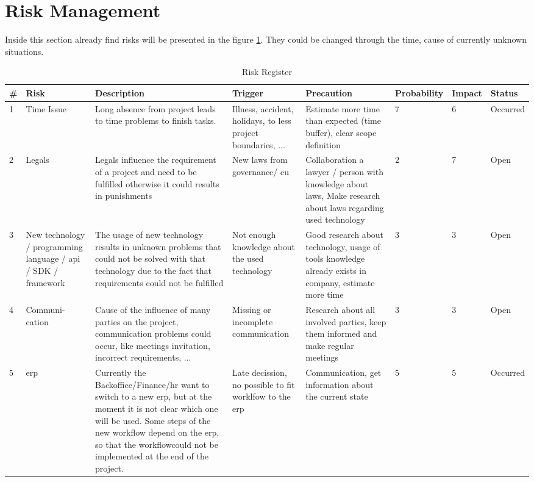 \section{Risk Management}
Inside this section already find risks will be presented in the figure \ref{fig:risks}. They could be changed through the time, cause of currently unknown situations.
\begin{center}
	\begin{landscape}
		\begin{table}[h]
			\begin{tabular}{|p{}|p{2cm}|p{4cm}|p{4cm}|p{4cm}|p{1,5cm}|p{}|p{}|} \hline
				\rowcolor{Gray} \# & Risk & Description & Trigger & Precaution & Probability & Impact & Status \\ \hline
				1 & Time Issue & Long absence from project leads to time problems to finish tasks. & Illness, accident, holidays, to less project boundaries, ... & Estimate more time than expected (time buffer), clear scope definition & 7 & 6 & Occurred \\ \hline
				2 & Legals & Legals influence the requirement of a project and need to be fulfilled otherwise it could results in punishments & New laws from governance/ \gls{eu} & Collaboration a lawyer / person with knowledge about laws, Make research about laws regarding used technology & 2 & 7 & Open \\ \hline
				3 & New technology / programming language / \gls{api} / \gls{SDK} / framework & The usage of new technology results	in unknown problems that could not be solved with that technology due to the fact that requirements could not be fulfilled & Not enough knowledge about 	the used technology & Good research about technology, usage of tools knowledge already exists in company, estimate more time & 3 & 3 & Open \\ \hline
				4 & Communi- cation & Cause of the influence of many parties on the project, communication problems could occur, like meetings invitation, incorrect requirements, ... & Missing or incomplete communication & Research about all involved parties, keep them informed and make regular meetings & 3 & 3 & Open \\ \hline
				5 & \gls{erp} & Currently the Backoffice/Finance/\gls{hr} want to switch to a new \gls{erp},
				but at the moment it is not clear which	one will be used. Some steps of	the new workflow depend on the \gls{erp}, so that the workflowcould not be implemented at the end	of the project. & Late decission, no possible to fit worklfow to the \gls{erp} & Communication, get information about the current state & 5 & 5 & Occurred \\ \hline
			\end{tabular}
			\caption{Risk Register}
			\label{fig:risks}
		\end{table}
	\end{landscape}
\end{center}
